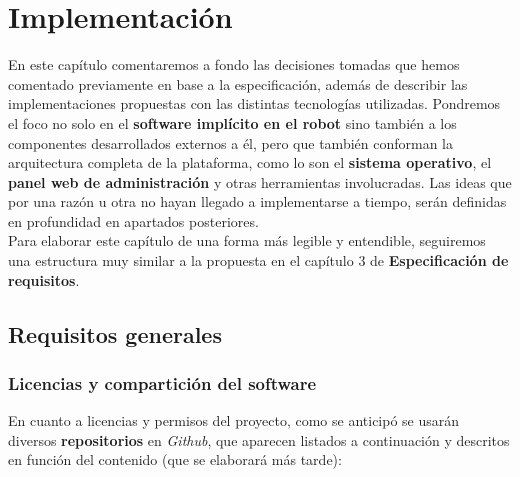 \chapter{Implementación}

En este capítulo comentaremos a fondo las decisiones tomadas que hemos comentado previamente en base a la especificación, además de describir las implementaciones propuestas con las distintas tecnologías utilizadas. Pondremos el foco no solo en el \textbf{software implícito en el robot} sino también a los componentes desarrollados externos a él, pero que también conforman la arquitectura completa de la plataforma, como lo son el \textbf{sistema operativo}, el \textbf{panel web de administración} y otras herramientas involucradas. Las ideas que por una razón u otra no hayan llegado a implementarse a tiempo, serán definidas en profundidad en apartados posteriores.\\

Para elaborar este capítulo de una forma más legible y entendible, seguiremos una estructura muy similar a la propuesta en el capítulo 3 de \textbf{Especificación de requisitos}.\\


\section{Requisitos generales}


\subsection{Licencias y compartición del software}

En cuanto a licencias y permisos del proyecto, como se anticipó se usarán diversos \textbf{repositorios} en \textit{Github}, que aparecen listados a continuación y descritos en función del contenido (que se elaborará más tarde):

